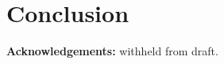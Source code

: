 \documentclass[11pt, executivepaper]{article}
\begin{document}
\section{Conclusion}
\label{conc}
\vspace{5mm}

\textbf{Acknowledgements:} withheld from draft.
\clearpage



\end{document}
